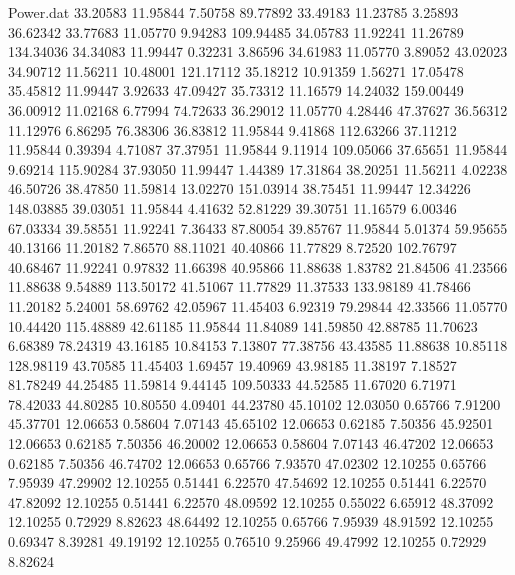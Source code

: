 \begin{filecontents}{Power.dat}
  33.20583   11.95844    7.50758   89.77892
  33.49183   11.23785    3.25893   36.62342
  33.77683   11.05770    9.94283  109.94485
  34.05783   11.92241   11.26789  134.34036
  34.34083   11.99447    0.32231    3.86596
  34.61983   11.05770    3.89052   43.02023
  34.90712   11.56211   10.48001  121.17112
  35.18212   10.91359    1.56271   17.05478
  35.45812   11.99447    3.92633   47.09427
  35.73312   11.16579   14.24032  159.00449
  36.00912   11.02168    6.77994   74.72633
  36.29012   11.05770    4.28446   47.37627
  36.56312   11.12976    6.86295   76.38306
  36.83812   11.95844    9.41868  112.63266
  37.11212   11.95844    0.39394    4.71087
  37.37951   11.95844    9.11914  109.05066
  37.65651   11.95844    9.69214  115.90284
  37.93050   11.99447    1.44389   17.31864
  38.20251   11.56211    4.02238   46.50726
  38.47850   11.59814   13.02270  151.03914
  38.75451   11.99447   12.34226  148.03885
  39.03051   11.95844    4.41632   52.81229
  39.30751   11.16579    6.00346   67.03334
  39.58551   11.92241    7.36433   87.80054
  39.85767   11.95844    5.01374   59.95655
  40.13166   11.20182    7.86570   88.11021
  40.40866   11.77829    8.72520  102.76797
  40.68467   11.92241    0.97832   11.66398
  40.95866   11.88638    1.83782   21.84506
  41.23566   11.88638    9.54889  113.50172
  41.51067   11.77829   11.37533  133.98189
  41.78466   11.20182    5.24001   58.69762
  42.05967   11.45403    6.92319   79.29844
  42.33566   11.05770   10.44420  115.48889
  42.61185   11.95844   11.84089  141.59850
  42.88785   11.70623    6.68389   78.24319
  43.16185   10.84153    7.13807   77.38756
  43.43585   11.88638   10.85118  128.98119
  43.70585   11.45403    1.69457   19.40969
  43.98185   11.38197    7.18527   81.78249
  44.25485   11.59814    9.44145  109.50333
  44.52585   11.67020    6.71971   78.42033
  44.80285   10.80550    4.09401   44.23780
  45.10102   12.03050    0.65766    7.91200
  45.37701   12.06653    0.58604    7.07143
  45.65102   12.06653    0.62185    7.50356
  45.92501   12.06653    0.62185    7.50356
  46.20002   12.06653    0.58604    7.07143
  46.47202   12.06653    0.62185    7.50356
  46.74702   12.06653    0.65766    7.93570
  47.02302   12.10255    0.65766    7.95939
  47.29902   12.10255    0.51441    6.22570
  47.54692   12.10255    0.51441    6.22570
  47.82092   12.10255    0.51441    6.22570
  48.09592   12.10255    0.55022    6.65912
  48.37092   12.10255    0.72929    8.82623
  48.64492   12.10255    0.65766    7.95939
  48.91592   12.10255    0.69347    8.39281
  49.19192   12.10255    0.76510    9.25966
  49.47992   12.10255    0.72929    8.82624

\end{filecontents}
